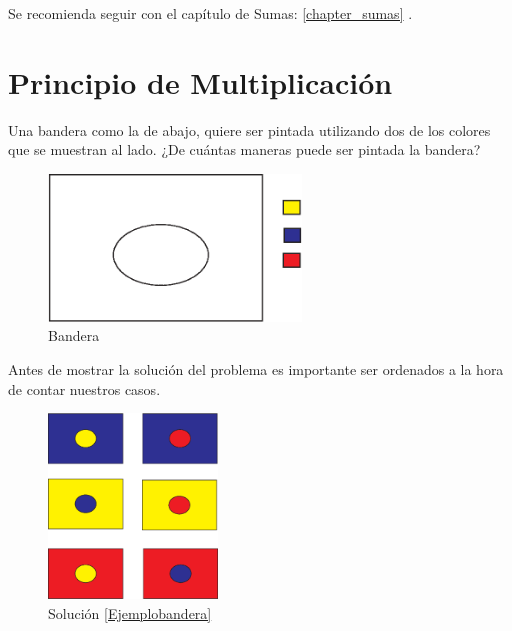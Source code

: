 \newpage	

\begin{tcolorbox}[colback=white!5!white,colframe=green!50!black]
	Se recomienda seguir con el capítulo de Sumas: \ref{chapter_sumas} .                                                         
\end{tcolorbox}


\chapter{Principio de Multiplicación}\label{Pmultiplicacion}


\begin{ejemplo}
	Una bandera como la de abajo, quiere ser pintada utilizando dos de los colores que se muestran al lado. ¿De cuántas maneras puede ser pintada la bandera?
	
	\begin{figure}[H]
		\centering
		\includegraphics[width=0.6\textwidth]{Combinatoria/imgs/Bandera.eps}
		\caption{Bandera}
		\label{fig:Bandera}
	\end{figure}
	
	\label{Ejemplobandera}
\end{ejemplo}
Antes de mostrar la solución del problema es importante ser ordenados a la hora de contar nuestros casos.
\begin{figure}[H]
	\centering
	\includegraphics[width=0.4\textwidth]{Combinatoria/imgs/banderasol.eps}
	\caption{Solución \ref{Ejemplobandera}}
	\label{solbandera}
\end{figure}


